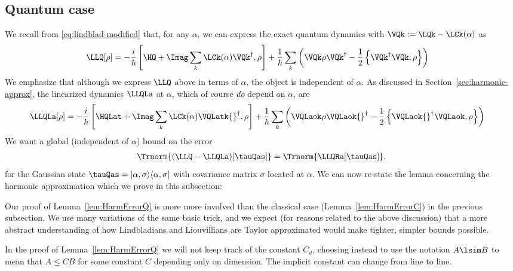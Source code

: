 \documentclass{article}
\numberwithin{equation}{section}
\begin{document}
\subsection{Quantum case}
\label{sec:quantum-bound-pf}


We recall from \eqref{eq:lindblad-modified} that, for any $\alpha$, we can express the exact quantum dynamics with $\VQk := \LQk - \LCk(\alpha)$ as
\begin{align}\label{eq:lindblad-modified-2}
	\LLQ[\rho]
	& = -\frac{i}{\hbar}\left[\HQ+\Imag \sum_k \LCk(\alpha) \VQk^\dagger ,\rho\right] + \frac{1}{\hbar} \sum_k \left( \VQk \rho \VQk^\dagger - \frac{1}{2} \left\{ \VQk^\dagger \VQk,\rho\right\} \right)
\end{align}
We emphasize that although we express $\LLQ$ above in terms of $\alpha$, the object is independent of $\alpha$. As discussed in Section~\ref{sec:harmonic-approx}, the linearized dynamics $\LLQLa$ at $\alpha$, which of course \emph{do} depend on $\alpha$, are
\begin{align}
	\LLQLa[\rho]
	& = -\frac{i}{\hbar}\left[\HQLat+\Imag \sum_k \LCk(\alpha) \VQLatk{}^\dagger ,\rho\right] + \frac{1}{\hbar} \sum_k \left( \VQLaok \rho \VQLaok{}^\dagger - \frac{1}{2} \left\{ \VQLaok{}^\dagger \VQLaok,\rho\right\} \right)
\end{align}
We want a global (independent of $\alpha$) bound on the error
\begin{align}
	\label{eq:quant-err-tracenorm}
	\Trnorm{(\LLQ-\LLQLa)[\tauQas]} =  \Trnorm{\LLQRa[	\tauQas]}.
\end{align}
for the Gaussian state $\tauQas = |\alpha,\sigma\rangle\langle \alpha,\sigma|$ with covariance matrix $\sigma$ located at $\alpha$. We can now re-state the lemma concerning the harmonic approximation which we prove in this subsection:

\lemHarmErrorQ*










Our proof of Lemma~\ref{lem:HarmErrorQ} is more
more involved than the classical case (Lemma~\ref{lem:HarmErrorC}) in the previous subsection.  We use many variations of the same basic trick, and we expect (for reasons related to the above discussion) that a more abstract  understanding of how Lindbladians and Liouvillians are Taylor approximated would make tighter, simpler bounds possible. 

In the proof of Lemma~\ref{lem:HarmErrorQ} we will not keep track of the constant $C_d$, choosing instead to use the notation $A\lsim B$ to mean that $A\leq CB$ for some constant $C$ depending only on dimension.  The implicit constant can change from line to line. 
\end{document}

